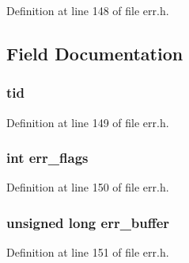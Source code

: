 Definition at line 148 of file err.\+h.



\subsection{Field Documentation}
\subsubsection[{\texorpdfstring{tid}{tid}}]{ tid}\hypertarget{structerr__state__st_afa854c76b90fea7cd16eade5477a6980}{}\label{structerr__state__st_afa854c76b90fea7cd16eade5477a6980}


Definition at line 149 of file err.\+h.

\subsubsection[{\texorpdfstring{err\+\_\+flags}{err_flags}}]{\setlength{\rightskip}{0pt plus 5cm}int err\+\_\+flags}\hypertarget{structerr__state__st_acb1c3c035c80936c05d086044c8acf54}{}\label{structerr__state__st_acb1c3c035c80936c05d086044c8acf54}


Definition at line 150 of file err.\+h.

\subsubsection[{\texorpdfstring{err\+\_\+buffer}{err_buffer}}]{\setlength{\rightskip}{0pt plus 5cm}unsigned long err\+\_\+buffer}\hypertarget{structerr__state__st_a64d5b4f1e28d753b84432495c9ffb6ee}{}\label{structerr__state__st_a64d5b4f1e28d753b84432495c9ffb6ee}


Definition at line 151 of file err.\+h.

